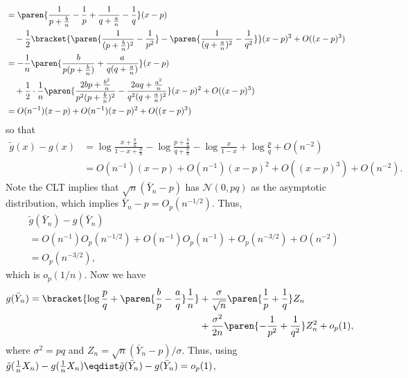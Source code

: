 \documentclass{homework}
\begin{document}
{\begin{enumerate}[label={(\roman*)}, topsep=0pt]
\begin{align*}
                  \\ &= \paren{ \frac1{p+\frac bn} - \frac1p +  \frac1{q+\frac an}-\frac 1q }(x-p)
                  \\ &\quad- \frac 12 \bracket{\paren{\frac1{(p+\frac bn)^2} - \frac 1{p^2}} - \paren{\frac1{(q+\frac an)^2} - \frac 1{q^2}}}(x-p)^2 + O((x-p)^3)
                  \\ &= -\frac 1 n \paren{ \frac{b}{p(p+\frac bn)} + \frac{a}{q(q+\frac an)} }(x-p)
                  \\ &\quad + \frac12 \cdot \frac 1n \paren{\frac{2bp + \frac {b^2}n}{p^2(p+\frac bn)^2} - \frac{2aq + \frac {a^2}n}{q^2(q+\frac an)^2} } (x-p)^2 + O((x-p)^3)
                  \\ &= O(n^{-1})(x-p) + O(n^{-1})(x-p)^2 + O((x-p)^3)
              \end{align*}
              so that
              \begin{align*}
                  \tilde g(x) - g(x) & =\log\frac{x + \frac bn}{1-x+\frac an} -\log \frac{p + \frac bn}{q + \frac an} - \log\frac{x}{1-x} + \log\frac pq + O(n^{-2})
                  \\ &= O(n^{-1})(x-p) + O(n^{-1})(x-p)^2 + O((x-p)^3)+O(n^{-2}).
              \end{align*}
              Note the CLT implies that $\sqrt n (\bar Y_n - p)$ has $\mathcal N(0,pq)$ as the asymptotic distribution, which implies $\bar Y_n - p = O_p(n^{-1/2})$. Thus,
              \begin{align*}
                   & \tilde g(\bar Y_n) - g(\bar Y_n)
                  \\ &= O(n^{-1})O_p(n^{-1/2}) + O(n^{-1})O_p(n^{-1}) + O_p(n^{-3/2})+O(n^{-2})
                  \\ &= O_p(n^{-3/2}),
              \end{align*}
              which is $o_p(1/n)$. Now we have
              \begin{align*}
                  g(\bar Y_n) = \bracket{\log\frac pq + \paren{\frac bp - \frac aq}\frac 1n} & + \frac{\sigma}{\sqrt n} \paren{\frac 1p+ \frac 1q}Z_n
                  \\&+ \frac{\sigma^2}{2n} \paren{-\frac 1{p^2} + \frac1{q^2}}Z_n^2 + o_p(1),
              \end{align*}
              where $\sigma^2 = pq$ and $Z_n = \sqrt n(\bar Y_n - p) / \sigma$.
              Thus, using $\tilde g(\frac 1n X_n)-g(\frac 1n X_n) \eqdist \tilde g(\bar Y_n)-g(\bar Y_n) = o_p(1)$,
              \begin{align*}

\end{align*}
\end{enumerate}}
\end{document}
